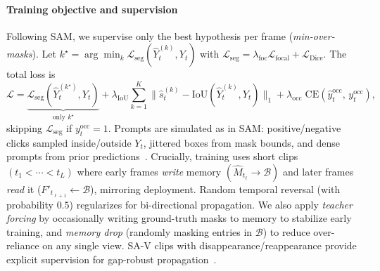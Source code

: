 \begin{enrichment}
\begin{enrichment}
		\paragraph{Training objective and supervision}
		Following SAM, we supervise only the best hypothesis per frame (\emph{min-over-masks}). Let $k^\star=\arg\min_k \mathcal{L}_{\text{seg}}(\hat{Y}_{t}^{(k)},Y_t)$ with $\mathcal{L}_{\text{seg}}=\lambda_{\text{foc}}\mathcal{L}_{\text{focal}}+\mathcal{L}_{\text{Dice}}$. The total loss is
		\[
		\mathcal{L} = \underbrace{\mathcal{L}_{\text{seg}}(\hat{Y}_t^{(k^\star)},Y_t)}_{\text{only }k^\star}
		+ \lambda_{\text{IoU}}\!\sum_{k=1}^{K}\!\bigl\lVert \hat{s}^{(k)}_t - \text{IoU}(\hat{Y}_t^{(k)},Y_t)\bigr\rVert_1
		+ \lambda_{\text{occ}}\;\text{CE}\!\left(\hat{y}^{\text{occ}}_t,\,y^{\text{occ}}_t\right),
		\]
		skipping $\mathcal{L}_{\text{seg}}$ if $y^{\text{occ}}_t{=}1$. Prompts are simulated as in SAM: positive/negative clicks sampled inside/outside $Y_t$, jittered boxes from mask bounds, and dense prompts from prior predictions~\cite{kirillov2023_sam}. Crucially, training uses short clips $(t_1{<}\cdots{<}t_L)$ where early frames \emph{write} memory $(\hat{M}_{t_\ell}\!\to\!\mathcal{B})$ and later frames \emph{read} it ($F'_{t_{\ell+1}}\!\leftarrow\!\mathcal{B}$), mirroring deployment. Random temporal reversal (with probability $0.5$) regularizes for bi-directional propagation. We also apply \emph{teacher forcing} by occasionally writing ground-truth masks to memory to stabilize early training, and \emph{memory drop} (randomly masking entries in $\mathcal{B}$) to reduce over-reliance on any single view. SA-V clips with disappearance/reappearance provide explicit supervision for gap-robust propagation~\cite{ravi2024_sam2}.
		

\end{enrichment}
\end{enrichment}
